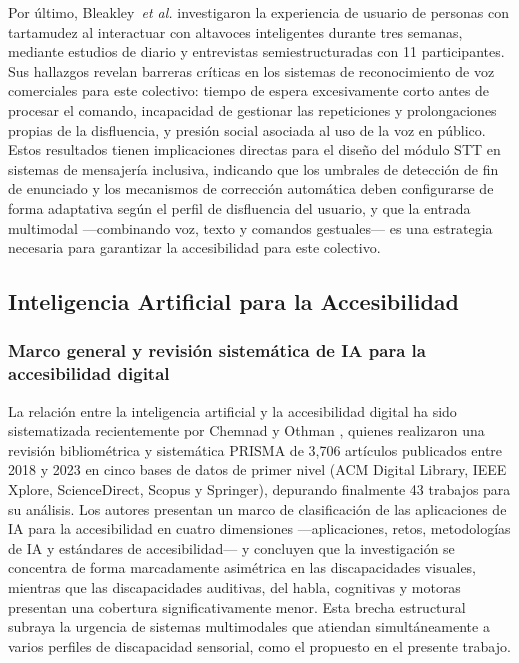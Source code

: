 \documentclass[journal]{IEEEtran}
\begin{document}
	Por \'ultimo, Bleakley~\textit{et al.} \cite{bleakley2022} investigaron la experiencia de usuario de personas con tartamudez al interactuar con altavoces inteligentes durante tres semanas, mediante estudios de diario y entrevistas semiestructuradas con 11 participantes. Sus hallazgos revelan barreras cr\'iticas en los sistemas de reconocimiento de voz comerciales para este colectivo: tiempo de espera excesivamente corto antes de procesar el comando, incapacidad de gestionar las repeticiones y prolongaciones propias de la disfluencia, y presi\'on social asociada al uso de la voz en p\'ublico. Estos resultados tienen implicaciones directas para el dise\~no del m\'odulo STT en sistemas de mensajer\'ia inclusiva, indicando que los umbrales de detecci\'on de fin de enunciado y los mecanismos de correcci\'on autom\'atica deben configurarse de forma adaptativa seg\'un el perfil de disfluencia del usuario, y que la entrada multimodal ---combinando voz, texto y comandos gestuales--- es una estrategia necesaria para garantizar la accesibilidad para este colectivo.
	
	\subsection{Inteligencia Artificial para la Accesibilidad}
	
	\subsubsection{Marco general y revisi\'on sistem\'atica de IA para la accesibilidad digital}
	La relaci\'on entre la inteligencia artificial y la accesibilidad digital ha sido sistematizada recientemente por Chemnad y Othman \cite{chemnad2024}, quienes realizaron una revisi\'on bibliom\'etrica y sistem\'atica PRISMA de 3{,}706 art\'iculos publicados entre 2018 y 2023 en cinco bases de datos de primer nivel (ACM Digital Library, IEEE Xplore, ScienceDirect, Scopus y Springer), depurando finalmente 43 trabajos para su an\'alisis. Los autores presentan un marco de clasificaci\'on de las aplicaciones de IA para la accesibilidad en cuatro dimensiones ---aplicaciones, retos, metodolog\'ias de IA y est\'andares de accesibilidad--- y concluyen que la investigaci\'on se concentra de forma marcadamente asim\'etrica en las discapacidades visuales, mientras que las discapacidades auditivas, del habla, cognitivas y motoras presentan una cobertura significativamente menor. Esta brecha estructural subraya la urgencia de sistemas multimodales que atiendan simult\'aneamente a varios perfiles de discapacidad sensorial, como el propuesto en el presente trabajo.
	
\end{document}
